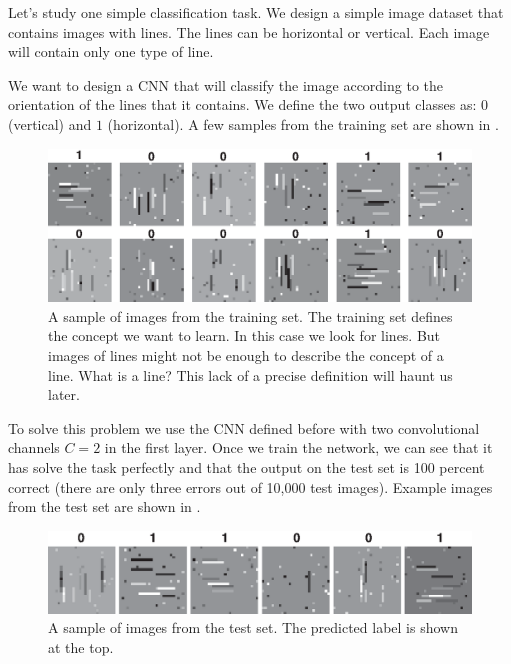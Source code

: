 Let's study one simple classification task. We design a simple image dataset that contains images with lines. The lines can be horizontal or vertical. Each image will contain only one type of line.

We want to design a CNN that will classify the image according to the orientation of the lines that it contains. We define the two output classes as: $0$ (vertical) and $1$ (horizontal). A few samples from the training set are shown in \fig{\ref{fig:convolutional_neural_nets:oriented_bars_cnn_trainingset}}.
\begin{figure}[h!]
    \centerline{
        \includegraphics[width=1.0\linewidth]{./figures/convolutional_neural_nets/oriented_bars_cnn_trainingset.eps}}
    \caption{A sample of images from the training set. The training set defines the concept we want to learn. In this case we look for lines. But images of lines might not be enough to describe the concept of a line. What is a line? This lack of a precise definition will haunt us later.}
    \label{fig:convolutional_neural_nets:oriented_bars_cnn_trainingset}
\end{figure}

To solve this problem we use the CNN defined before with two convolutional channels $C=2$ in the first layer. Once we train the network, we can see that it has solve the task perfectly and that the output on the test set is 100 percent correct (there are only three errors out of 10,000 test images). Example images from the test set are shown in \fig{\ref{fig:convolutional_neural_nets:oriented_bars_cnn_testset}}.
\begin{figure}[h!]
    \includegraphics[width=1\linewidth]{./figures/convolutional_neural_nets/oriented_bars_cnn_testset.eps}
    \caption{A sample of images from the test set. The predicted label is shown at the top.}
    \label{fig:convolutional_neural_nets:oriented_bars_cnn_testset}
\end{figure}

